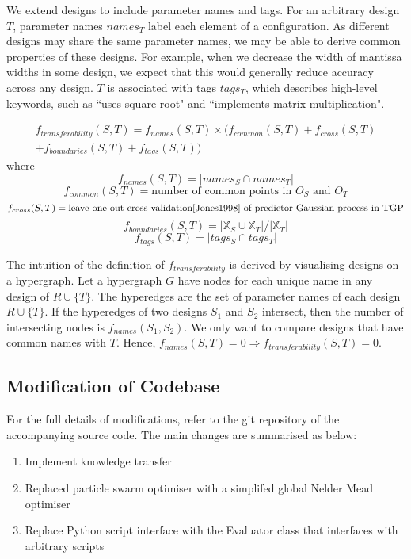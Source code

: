 \documentclass[10pt,a4paper]{article}
\begin{document}
We extend designs to include parameter names and tags. For an arbitrary design $T$, parameter names $names_T$ label each element of a configuration. As different designs may share the same parameter names, we may be able to derive common properties of these designs. For example, when we decrease the width of mantissa widths in some design, we expect that this would generally reduce accuracy across any design. $T$ is associated with tags $tags_T$, which describes high-level keywords, such as ``uses square root" and ``implements matrix multiplication".

\[
	\begin{split}
		f_{transferability}(S,T)=f_{names}(S,T)\times(f_{common}(S,T)+f_{cross}(S,T)\\
			+f_{boundaries}(S,T)+f_{tags}(S,T))
	\end{split}
\] where
\[f_{names}(S,T)=|names_S\cap names_T|\]
\[f_{common}(S,T)=\text{number of common points in $O_S$ and $O_T$}\]
\[f_{cross}(S,T)=\text{leave-one-out cross-validation\cite{Jones1998} of predictor Gaussian process in TGP}\]
\[f_{boundaries}(S,T)=|\mathbb{X}_S\cup\mathbb{X}_T|/|\mathbb{X}_T|\]
\[f_{tags}(S,T)=|tags_S\cap tags_T|\]

The intuition of the definition of $f_{transferability}$ is derived by visualising designs on a hypergraph. Let a hypergraph $G$ have nodes for each unique name in any design of $R\cup\{T\}$. The hyperedges are the set of parameter names of each design $R\cup\{T\}$. If the hyperedges of two designs $S_1$ and $S_2$ intersect, then the number of intersecting nodes is $f_{names}(S_1,S_2)$. We only want to compare designs that have common names with $T$. Hence, $f_{names}(S,T)=0\Rightarrow f_{transferability}(S,T)=0$.

\subsection{Modification of Codebase}

For the full details of modifications, refer to the git repository of the accompanying source code. The main changes are summarised as below:
\begin{enumerate}
	\item Implement knowledge transfer
	\item Replaced particle swarm optimiser with a simplifed global Nelder Mead optimiser\cite{Luersen2004}
	\item Replace Python script interface with the Evaluator class that interfaces with arbitrary scripts
\end{enumerate}
\end{document}
